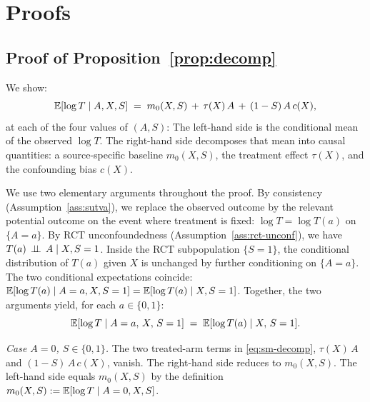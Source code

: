 
\section{Proofs}\label{sm:proofs}
\subsection{Proof of Proposition~\ref{prop:decomp}}
We show:
\begin{equation}
\mathbb{E}[\log T \mid A, X, S] \;=\; m_0(X, S) \,+\, \tau(X)\,A \,+\, (1 - S)\,A\,c(X),
\label{eq:sm-decomp}
\end{equation}
at each of the four values of $(A, S)$:
The left-hand side is the conditional mean of the observed $\log T$.
The right-hand side decomposes that mean into causal quantities: a source-specific baseline $m_0(X, S)$, the treatment effect $\tau(X)$, and the confounding bias $c(X)$.

We use two elementary arguments throughout the proof.
By consistency (Assumption~\ref{ass:sutva}), we replace the observed outcome by the relevant potential outcome on the event where treatment is fixed: $\log T = \log T(a)$ on $\{A = a\}$.
By RCT unconfoundedness (Assumption~\ref{ass:rct-unconf}), we have $T(a) \,\perp\!\!\!\perp\, A \mid X, S = 1$.
Inside the RCT subpopulation $\{S = 1\}$, the conditional distribution of $T(a)$ given $X$ is unchanged by further conditioning on $\{A = a\}$.
The two conditional expectations coincide: $\mathbb{E}[\log T(a) \mid A = a, X, S = 1] = \mathbb{E}[\log T(a) \mid X, S = 1]$.
Together, the two arguments yield, for each $a \in \{0, 1\}$:
\begin{equation}
\mathbb{E}[\log T \mid A = a,\, X,\, S = 1] \;=\; \mathbb{E}[\log T(a) \mid X,\, S = 1].
\label{eq:po-step}
\end{equation}

\emph{Case $A = 0$, $S \in \{0, 1\}$.}
The two treated-arm terms in \eqref{eq:sm-decomp}, $\tau(X)\,A$ and $(1 - S)\,A\,c(X)$, vanish.
The right-hand side reduces to $m_0(X, S)$.
The left-hand side equals $m_0(X, S)$ by the definition $m_0(X, S) := \mathbb{E}[\log T \mid A = 0, X, S]$.

